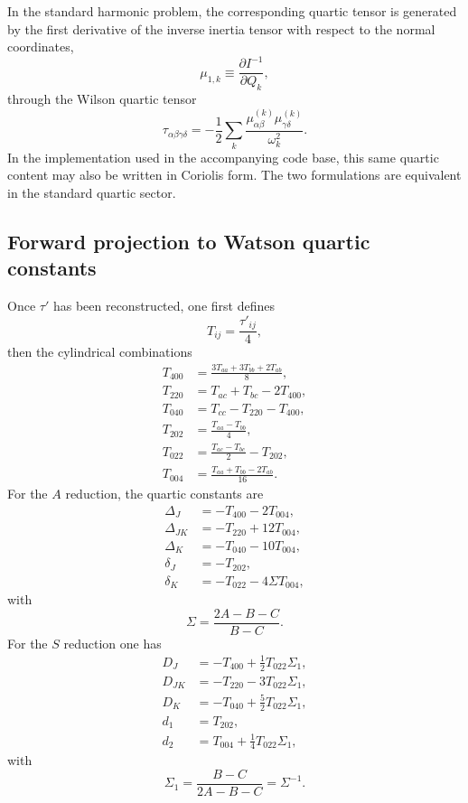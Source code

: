 \documentclass[aip,jcp,reprint,floatfix]{revtex4-2}
\begin{document}
In the standard harmonic problem, the corresponding quartic tensor is generated
by the first derivative of the inverse inertia tensor with respect to the
normal coordinates,
\begin{equation}
\mu_{1,k} \equiv \frac{\partial I^{-1}}{\partial Q_k},
\end{equation}
through the Wilson quartic tensor
\begin{equation}
\tau_{\alpha\beta\gamma\delta}
=
-\frac12
\sum_k
\frac{
\mu_{\alpha\beta}^{(k)}
\mu_{\gamma\delta}^{(k)}
}{\omega_k^2}.
\label{eq:app_quartic_tau}
\end{equation}
In the implementation used in the accompanying code base, this same quartic
content may also be written in Coriolis form. The two formulations are
equivalent in the standard quartic sector.

\subsection{Forward projection to Watson quartic constants}

Once $\tau'$ has been reconstructed, one first defines
\begin{equation}
T_{ij} = \frac{\tau'_{ij}}{4},
\end{equation}
then the cylindrical combinations
\begin{align}
T_{400} &= \frac{3T_{aa}+3T_{bb}+2T_{ab}}{8}, \\
T_{220} &= T_{ac}+T_{bc}-2T_{400}, \\
T_{040} &= T_{cc}-T_{220}-T_{400}, \\
T_{202} &= \frac{T_{aa}-T_{bb}}{4}, \\
T_{022} &= \frac{T_{ac}-T_{bc}}{2}-T_{202}, \\
T_{004} &= \frac{T_{aa}+T_{bb}-2T_{ab}}{16}.
\end{align}
For the $A$ reduction, the quartic constants are
\begin{align}
\Delta_J   &= -T_{400}-2T_{004}, \\
\Delta_{JK}&= -T_{220}+12T_{004}, \\
\Delta_K   &= -T_{040}-10T_{004}, \\
\delta_J   &= -T_{202}, \\
\delta_K   &= -T_{022}-4\Sigma T_{004},
\end{align}
with
\begin{equation}
\Sigma = \frac{2A-B-C}{B-C}.
\end{equation}
For the $S$ reduction one has
\begin{align}
D_J   &= -T_{400}+\frac12 T_{022}\Sigma_1, \\
D_{JK}&= -T_{220}-3T_{022}\Sigma_1, \\
D_K   &= -T_{040}+\frac52 T_{022}\Sigma_1, \\
d_1   &= T_{202}, \\
d_2   &= T_{004}+\frac14 T_{022}\Sigma_1,
\end{align}
with
\begin{equation}
\Sigma_1 = \frac{B-C}{2A-B-C} = \Sigma^{-1}.
\end{equation}
\end{document}
